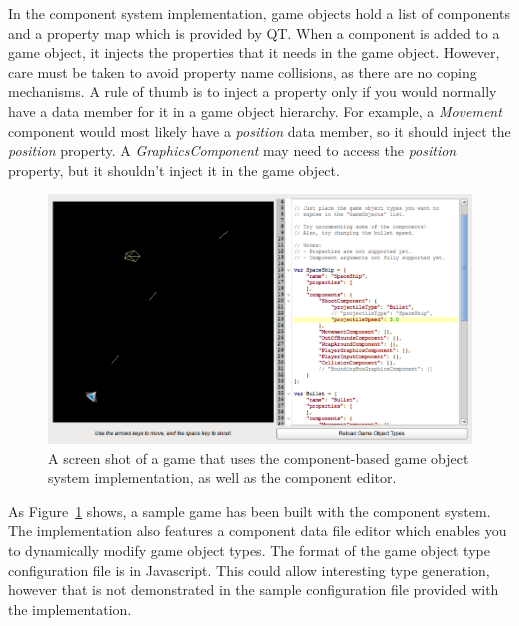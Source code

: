 \documentclass[
    phd,
    electronic,
    letterpaper,
    simplechapterheading,
    openany,
    parttop,
    lof,
]{byumsphd}
\begin{document}
In the component system implementation, game objects hold a list of components and a property map which is provided by QT. When a component is added to a game object, it injects the properties that it needs in the game object. However, care must be taken to avoid property name collisions, as there are no coping mechanisms. A rule of thumb is to inject a property only if you would normally have a data member for it in a game object hierarchy. For example, a \textit{Movement} component would most likely have a \textit{position} data member, so it should inject the \textit{position} property. A \textit{GraphicsComponent} may need to access the \textit{position} property, but it shouldn't inject it in the game object.

\begin{figure}[H]
\bigskip
\centering
\includegraphics[width=\linewidth]{images/implementation-screenshot.png}
\caption{A screen shot of a game that uses the component-based game object system implementation, as well as the component editor. }
\label{fig:implementation:1}
\end{figure}

As Figure~\ref{fig:implementation:1} shows, a sample game has been built with the component system. The implementation also features a component data file editor which enables you to dynamically modify game object types. The format of the game object type configuration file is in Javascript. This could allow interesting type generation, however that is not demonstrated in the sample configuration file provided with the implementation.
\end{document}
